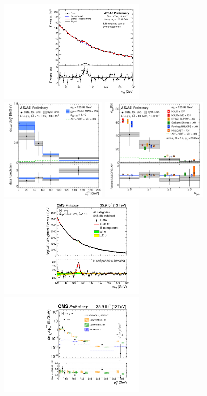 \documentclass[10pt]{article}
\begin{document}
\begin{figure}[htb]
\centering
\includegraphics[height=2in]{figures/ATLAS-CONF-2016-067__fig_07__mgg.pdf}
\includegraphics[height=2in]{figures/ATLAS-CONF-2016-067__fig_10a__pTgg.pdf}
\includegraphics[height=2in]{figures/ATLAS-CONF-2016-067__fig_11b__njets.pdf}\\
\includegraphics[height=2in]{figures/CMS-HIG-16-040__Figure_013-b__mgg.pdf}
\includegraphics[height=2in]{figures/CMS-HIG-17-015__Figure_004-a__pTgg.pdf}

\end{figure}
\end{document}
